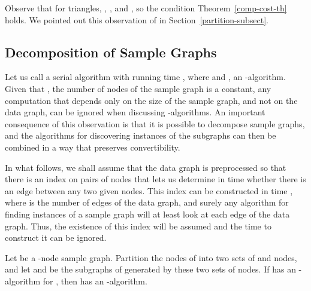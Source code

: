\begin{example}
\label{comp-tri-ex}
Observe that for triangles, , , and , so the condition Theorem~\ref{comp-cost-th} holds.  We pointed out this observation of \cite{SV11} in Section~\ref{partition-subsect}.
\end{example}

\subsection{Decomposition of Sample Graphs}
\label{sg-decomp-subsect}

Let us call a serial algorithm with running time , where  and , an -algorithm.
Given that , the number of nodes of the sample graph is a constant, any computation that depends only on the size of the sample graph, and not on the data graph, can be ignored when discussing -algorithms.
An important consequence of this observation is that it is possible to decompose sample graphs, and the algorithms for discovering instances of the subgraphs can then be combined in a way that preserves convertibility.

In what follows, we shall assume that the data graph is preprocessed so that there is an index on pairs of nodes that lets us determine in  time whether there is an edge between any two given nodes.  This index can be constructed in time , where  is the number of edges of the data graph, and surely any algorithm for finding instances of a sample graph will at least look at each edge of the data graph.  Thus, the existence of this index will be assumed and the time to construct it can be ignored.

\begin{lemma}
\label{a-b-lemma}
Let  be a -node sample graph.  Partition the nodes of  into two sets of  and  nodes, and let  and  be the subgraphs of  generated by these two sets of nodes.  If  has an -algorithm for , then  has an -algorithm.
\end{lemma}


